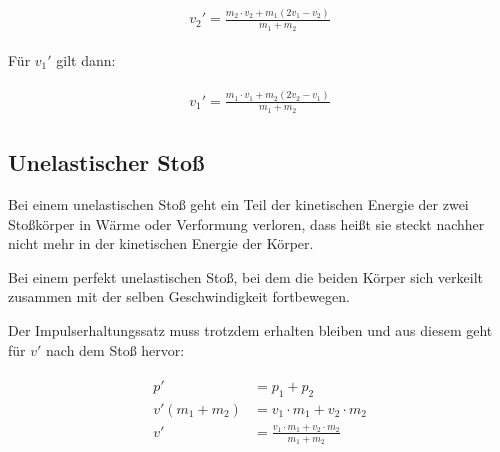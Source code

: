 \begin{align}
\begin{split}
	v_2'=\frac{m_2 \cdot v_2 + m_1(2v_1 - v_2)}{m_1 + m_2}
\end{split}
\end{align}

\noindent Für $v_1'$ gilt dann:

\begin{align}
\begin{split}
	v_1'=\frac{m_1 \cdot v_1 + m_2(2v_2 - v_1)}{m_1 + m_2}
\end{split}
\end{align}


\subsection{Unelastischer Stoß}

Bei einem unelastischen Stoß geht ein Teil der kinetischen Energie der zwei Stoßkörper in Wärme oder Verformung \glqq verloren\grqq , dass heißt sie steckt nachher nicht mehr in der kinetischen Energie der Körper. 

Bei einem perfekt unelastischen Stoß, bei dem die beiden Körper sich \glqq verkeilt\grqq{} zusammen mit der selben Geschwindigkeit fortbewegen. 

Der Impulserhaltungssatz muss trotzdem erhalten bleiben und aus diesem geht für $v'$ nach dem Stoß hervor:

\begin{align}
\begin{split}
	p' &= p_1 + p_2 \\
	v'(m_1 + m_2) &= v_1 \cdot m_1 + v_2 \cdot m_2 \\
	v' &= \frac{v_1 \cdot m_1 + v_2 \cdot m_2}{m_1 + m_2}
\end{split}
\end{align}

